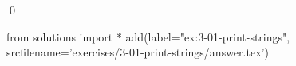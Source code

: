 
\begin{ex}
  \label{ex:3-01-print-strings}
  
  \qed
\end{ex}
\begin{python0}
from solutions import *
add(label="ex:3-01-print-strings",
    srcfilename='exercises/3-01-print-strings/answer.tex')
\end{python0}
